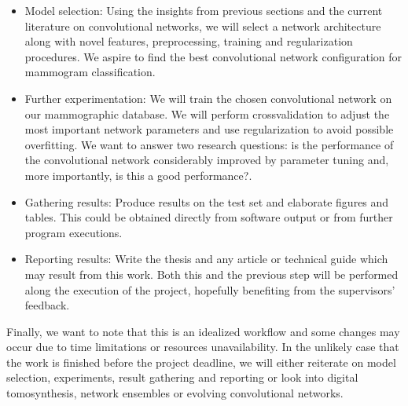 \begin{itemize}
	\item Model selection: Using the insights from previous sections and the current literature on convolutional networks, we will select a network architecture along with novel features, preprocessing, training and regularization procedures. We aspire to find the best convolutional network configuration for mammogram classification.
	\item Further experimentation: We will train the chosen convolutional network on our mammographic database. We will perform crossvalidation to adjust the most important network parameters and use regularization to avoid possible overfitting. We want to answer two research questions: is the performance of the convolutional network considerably improved by parameter tuning and, more importantly, is this a good performance?.
	\item Gathering results: Produce results on the test set and elaborate figures and tables. This could be obtained directly from software output or from further program executions.
	\item Reporting results: Write the thesis and any article or technical guide which may result from this work. Both this and the previous step will be performed along the execution of the project, hopefully benefiting from the supervisors' feedback.
\end{itemize}
Finally, we want to note that this is an idealized workflow and some changes may occur due to time limitations or resources unavailability. In the unlikely case that the work is finished before the project deadline, we will either reiterate on model selection, experiments, result gathering and reporting or look into digital tomosynthesis, network ensembles or evolving convolutional networks.

\begin{comment}
La {\it Metodología} (o lo que algunos autores llaman el {\it Método})
 es el proceso o
conjunto de pasos que debe efectuarse para llegar a cumplir con los
objetivos. Esos pasos deben contener  los experimentos a realizar, la forma de
llevarlos a cabo, la evaluación de los resultados, la prueba de las hipótesis,
la respuesta a las preguntas de investigación y el último paso debe ser el
reporte escrito de los resultados.
\end{comment}
